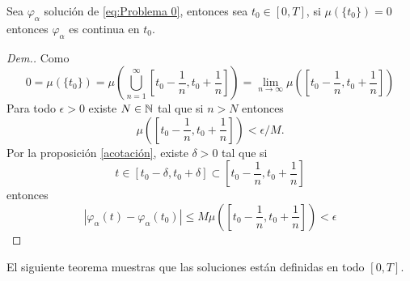 \begin{cor}\label{corolario_continuidad}
    Sea $\varphi_\alpha$ solución de \ref{eq:Problema 0}, entonces sea $t_0\in [0,T]$, si $\mu(\{t_0\})=0$ entonces $\varphi_\alpha$ es continua en $t_0$.
    
\end{cor}
\begin{proof}[Dem.]
Como $$0=\mu\left(\{t_0\}\right)=\mu\left(\bigcup_{n=1}^{\infty}\left[t_0-\frac{1}{n},t_0+\frac{1}{n}\right]\right)=\lim_{n\to\infty}\mu\left(\left[t_0-\frac{1}{n},t_0+\frac{1}{n}\right]\right)$$    
Para todo $\epsilon>0$ existe $N\in\mathbb{N}$ tal que si $n>N$ entonces $$\mu\left(\left[t_0-\frac{1}{n},t_0+\frac{1}{n}\right]\right)<\epsilon/M.$$
Por la proposición \eqref{acotación}, existe $\delta>0$ tal que si $$t\in\left[t_0-\delta,t_0+\delta\right]\subset\left[t_0-\frac{1}{n},t_0+\frac{1}{n}\right]$$ entonces
\begin{equation}
    |\varphi_\alpha(t)-\varphi_\alpha(t_0)|\leq M\mu\left(\left[t_0-\frac{1}{n},t_0+\frac{1}{n}\right]\right)<\epsilon
\end{equation}
\end{proof}




El siguiente teorema muestras que las soluciones están definidas en todo $[0,T]$.

